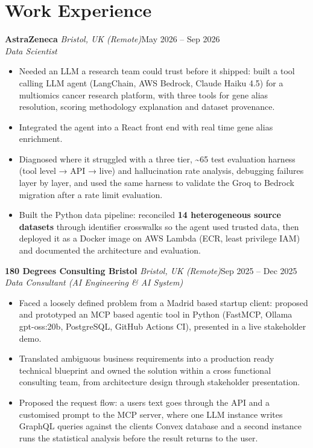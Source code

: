 \documentclass[a4paper,11pt]{article}
\newcommand{\role}[4]{%
  \textbf{#1}{\color{muted}\,\textperiodcentered\,\textit{#2}}\hfill{\color{muted}#3}\\
  \textit{#4}\par}
\newcommand{\gap}{\vspace{5pt}}
\newcommand{\num}[1]{\textbf{#1}}   %
\begin{document}
\section{Work Experience}
\role{AstraZeneca}{Bristol, UK (Remote)}{May 2026 – Sep 2026}{Data Scientist}
\begin{itemize}
  \item Needed an LLM a research team could trust before it shipped: built a tool calling LLM agent (LangChain, AWS Bedrock, Claude Haiku 4.5) for a multiomics cancer research platform, with three tools for gene alias resolution, scoring methodology explanation and dataset provenance.
  \item Integrated the agent into a React front end with real time gene alias enrichment.
  \item Diagnosed where it struggled with a three tier, \textasciitilde{}65 test evaluation harness (tool level → API → live) and hallucination rate analysis, debugging failures layer by layer, and used the same harness to validate the Groq to Bedrock migration after a rate limit evaluation.
  \item Built the Python data pipeline: reconciled \num{14 heterogeneous source datasets} through identifier crosswalks so the agent used trusted data, then deployed it as a Docker image on AWS Lambda (ECR, least privilege IAM) and documented the architecture and evaluation.
\end{itemize}
\gap
{}
\role{180 Degrees Consulting Bristol}{Bristol, UK (Remote)}{Sep 2025 – Dec 2025}{Data Consultant (AI Engineering \& AI System)}
\begin{itemize}
  \item Faced a loosely defined problem from a Madrid based startup client: proposed and prototyped an MCP based agentic tool in Python (FastMCP, Ollama gpt-oss:20b, PostgreSQL, GitHub Actions CI), presented in a live stakeholder demo.
  \item Translated ambiguous business requirements into a production ready technical blueprint and owned the solution within a cross functional consulting team, from architecture design through stakeholder presentation.
  \item Proposed the request flow: a user\textquotesingle{}s text goes through the API and a customised prompt to the MCP server, where one LLM instance writes GraphQL queries against the client\textquotesingle{}s Convex database and a second instance runs the statistical analysis before the result returns to the user.
\end{itemize}
\end{document}
